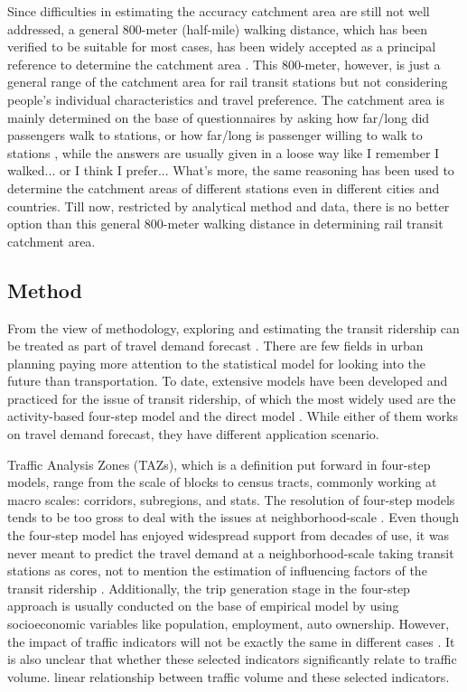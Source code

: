 Since difficulties in estimating the accuracy catchment area are still not well addressed, a general 800-meter (half-mile) walking distance, which has been verified to be suitable for most cases, has been widely accepted as a principal reference to determine the catchment area \cite{kuby2004factors,gutierrez2011transit,cardozo2012application,zhao2013influences}. This 800-meter, however, is just a general range of the catchment area for rail transit stations but not considering people's individual characteristics and travel preference. The catchment area is mainly determined on the base of questionnaires by asking how far/long did passengers walk to stations, or how far/long is passenger willing to walk to stations \cite{keijer2000people,zhao2003forecasting,garcia2013walking}, while the answers are usually given in a loose way like I remember I walked... or I think I prefer... What's more, the same reasoning has been used to determine the catchment areas of different stations even in different cities and countries. Till now, restricted by analytical method and data, there is no better option than this general 800-meter walking distance in determining rail transit catchment area.

%
\subsection{Method}
From the view of methodology, exploring and estimating the transit ridership can be treated as part of travel demand forecast \cite{miller1999potential,boyce1994introducing}. There are few fields in urban planning paying more attention to the statistical model for looking into the future than transportation. To date, extensive models have been developed and practiced for the issue of transit ridership, of which the most widely used are the activity-based four-step model and the direct model \cite{mcnally2007four,ewing2010travel}. While either of them works on travel demand forecast, they have different application scenario.

Traffic Analysis Zones (TAZs), which is a definition put forward in four-step models, range from the scale of blocks to census tracts, commonly working at macro scales: corridors, subregions, and stats. The resolution of four-step models tends to be too gross to deal with the issues at neighborhood-scale \cite{cervero2006alternative}. Even though the four-step model has enjoyed widespread support from decades of use, it was never meant to predict the travel demand at a neighborhood-scale taking transit stations as cores, not to mention the estimation of influencing factors of the transit ridership \cite{cervero2006alternative,chu2004ridership,duduta2013direct}. Additionally, the trip generation stage in the four-step approach is usually conducted on the base of empirical model by using socioeconomic variables like population, employment, auto ownership. However, the impact of traffic indicators will not be exactly the same in different cases \cite{jones1983demand}. It is also unclear that whether these selected indicators significantly relate to traffic volume. linear relationship between traffic volume and these selected indicators. 

